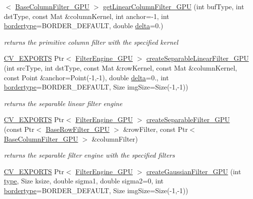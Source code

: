 \begin{DoxyCompactItemize}
$<$ \hyperlink{classcv_1_1ocl_1_1BaseColumnFilter__GPU}{Base\-Column\-Filter\-\_\-\-G\-P\-U} $>$ \hyperlink{namespacecv_1_1ocl_a93d0c4c54658687facea7b5c37c33b9a}{get\-Linear\-Column\-Filter\-\_\-\-G\-P\-U} (int buf\-Type, int dst\-Type, const Mat \&column\-Kernel, int anchor=-\/1, int \hyperlink{imgproc__c_8h_a217d51a46c1bcfec1157d02663e6e499}{bordertype}=B\-O\-R\-D\-E\-R\-\_\-\-D\-E\-F\-A\-U\-L\-T, double \hyperlink{legacy_8hpp_ac867054f00f4be8b1f3ebce6fba31982}{delta}=0.)
\begin{DoxyCompactList}\small\item\em returns the primitive column filter with the specified kernel \end{DoxyCompactList}\item 
\hyperlink{core_2types__c_8h_a1bf9f0e121b54272da02379cfccd0a2b}{C\-V\-\_\-\-E\-X\-P\-O\-R\-T\-S} Ptr$<$ \hyperlink{classcv_1_1ocl_1_1FilterEngine__GPU}{Filter\-Engine\-\_\-\-G\-P\-U} $>$ \hyperlink{namespacecv_1_1ocl_a8d7fb531b1444914a5d1398ae9211b55}{create\-Separable\-Linear\-Filter\-\_\-\-G\-P\-U} (int src\-Type, int dst\-Type, const Mat \&row\-Kernel, const Mat \&column\-Kernel, const Point \&anchor=Point(-\/1,-\/1), double \hyperlink{legacy_8hpp_ac867054f00f4be8b1f3ebce6fba31982}{delta}=0., int \hyperlink{imgproc__c_8h_a217d51a46c1bcfec1157d02663e6e499}{bordertype}=B\-O\-R\-D\-E\-R\-\_\-\-D\-E\-F\-A\-U\-L\-T, Size img\-Size=Size(-\/1,-\/1))
\begin{DoxyCompactList}\small\item\em returns the separable linear filter engine \end{DoxyCompactList}\item 
\hyperlink{core_2types__c_8h_a1bf9f0e121b54272da02379cfccd0a2b}{C\-V\-\_\-\-E\-X\-P\-O\-R\-T\-S} Ptr$<$ \hyperlink{classcv_1_1ocl_1_1FilterEngine__GPU}{Filter\-Engine\-\_\-\-G\-P\-U} $>$ \hyperlink{namespacecv_1_1ocl_a2d0129d77a7dc68af771d87919b9717c}{create\-Separable\-Filter\-\_\-\-G\-P\-U} (const Ptr$<$ \hyperlink{classcv_1_1ocl_1_1BaseRowFilter__GPU}{Base\-Row\-Filter\-\_\-\-G\-P\-U} $>$ \&row\-Filter, const Ptr$<$ \hyperlink{classcv_1_1ocl_1_1BaseColumnFilter__GPU}{Base\-Column\-Filter\-\_\-\-G\-P\-U} $>$ \&column\-Filter)
\begin{DoxyCompactList}\small\item\em returns the separable filter engine with the specified filters \end{DoxyCompactList}\item 
\hyperlink{core_2types__c_8h_a1bf9f0e121b54272da02379cfccd0a2b}{C\-V\-\_\-\-E\-X\-P\-O\-R\-T\-S} Ptr$<$ \hyperlink{classcv_1_1ocl_1_1FilterEngine__GPU}{Filter\-Engine\-\_\-\-G\-P\-U} $>$ \hyperlink{namespacecv_1_1ocl_a1849e8130c0dace1be579e8841c7c5e1}{create\-Gaussian\-Filter\-\_\-\-G\-P\-U} (int \hyperlink{imgproc__c_8h_a84612d8738bf935200cf32a103d8efe1}{type}, Size ksize, double sigma1, double sigma2=0, int \hyperlink{imgproc__c_8h_a217d51a46c1bcfec1157d02663e6e499}{bordertype}=B\-O\-R\-D\-E\-R\-\_\-\-D\-E\-F\-A\-U\-L\-T, Size img\-Size=Size(-\/1,-\/1))

\end{DoxyCompactItemize}
